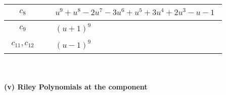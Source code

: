 \documentclass[1p]{elsarticle_modified}
\theoremstyle{definition}
\begin{document}
\begin{tabular}{m{50pt}|m{274pt}}
\hline $$\begin{aligned}c_{8}\end{aligned}$$&$\begin{aligned}
&u^9+u^8-2 u^7-3 u^6+u^5+3 u^4+2 u^3- u-1
\end{aligned}$\\
\hline $$\begin{aligned}c_{9}\end{aligned}$$&$\begin{aligned}
&(u+1)^9
\end{aligned}$\\
\hline $$\begin{aligned}c_{11},c_{12}\end{aligned}$$&$\begin{aligned}
&(u-1)^9
\end{aligned}$\\
\hline
\end{tabular}\\~\\
\newpage\renewcommand{\arraystretch}{1}
\flushleft \textbf{(v) Riley Polynomials at the component}\newline \\
\end{document}
